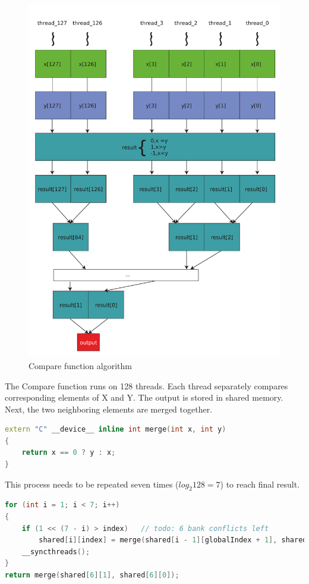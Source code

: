 \documentclass[oneside,openright,12pt,final,en]{mgr}
\begin{document}
\begin{figure}[H]
	\centering
	\includegraphics[width=\textwidth]{al_compare}
	\caption{Compare function algorithm}
	\label{fig:al_compare}
\end{figure}

The Compare function runs on 128 threads. Each thread separately compares corresponding elements of X and Y. The output is stored in shared memory. Next, the two neighboring elements are merged together.

\begin{lstlisting}[language=cpp]
extern "C" __device__ inline int merge(int x, int y)
{
	return x == 0 ? y : x;
}
\end{lstlisting}

This process needs to be repeated seven times ($log_2 128=7$) to reach final result.

\begin{lstlisting}[language=cpp]
for (int i = 1; i < 7; i++)
{
	if (1 << (7 - i) > index)	// todo: 6 bank conflicts left
		shared[i][index] = merge(shared[i - 1][globalIndex + 1], shared[i - 1][globalIndex]);
	__syncthreads();
}
return merge(shared[6][1], shared[6][0]);
\end{lstlisting}
\end{document}
